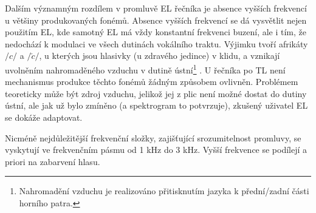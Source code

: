 Dalším významným rozdílem v promluvě EL řečníka je absence vyšších frekvencí u většiny produkovaných fonémů.
Absence vyšších frekvencí se dá vysvětlit nejen použitím EL, kde samotný EL má vždy konstantní frekvenci buzení, ale i tím, že nedochází k modulaci ve všech dutinách vokálního traktu.
Výjimku tvoří afrikáty $/c/$ a $/\check{c}/$, u kterých jsou hlasivky (u zdravého jedince) v klidu, a vznikají uvolněním nahromaděného vzduchu v dutině ústní\footnote{Nahromadění vzduchu je realizováno přitisknutím jazyka k přední/zadní části horního patra.} \cite{Psutka2006}.
U řečníka po TL není mechanismus produkce těchto fonémů žádným způsobem ovlivněn.
Problémem teoreticky může být zdroj vzduchu, jelikož jej z plic není možné dostat do dutiny ústní, ale jak už bylo zmíněno (a spektrogram to potvrzuje), zkušený uživatel EL se dokáže adaptovat.

 Nicméně nejdůležitější frekvenční složky, zajišťující srozumitelnost promluvy, se vyskytují ve frekvenčním pásmu od 1 kHz do 3 kHz.
 Vyšší frekvence se podílejí a priori na zabarvení hlasu.


